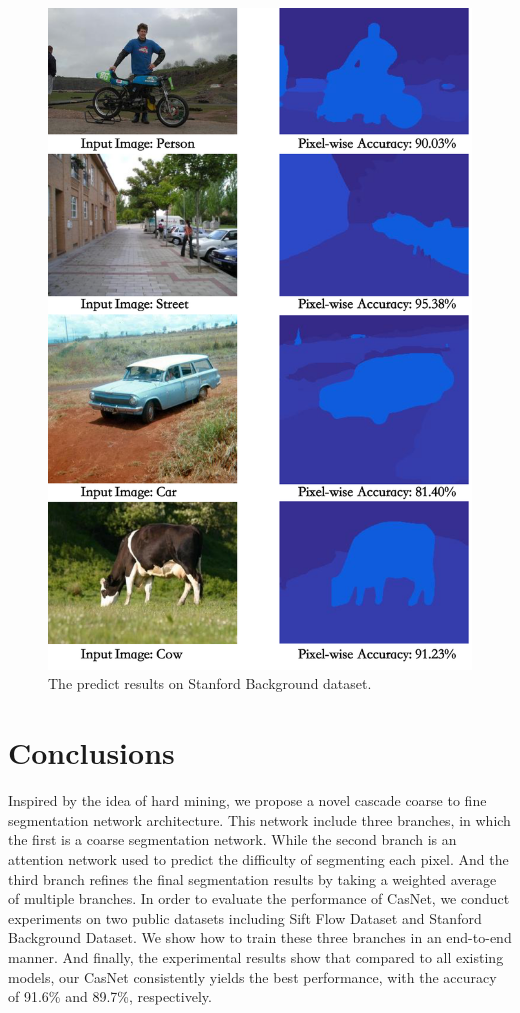 \documentclass[10.5pt,compsoc]{TsT}
\theoremstyle{mystyle}
\begin{document}
{\begin{figure}[ht]
\centering
\includegraphics[width=0.85\columnwidth]{fig4.png}
\caption{The predict results on Stanford Background dataset.}
\label{fig4}
\end{figure} 

\section{Conclusions}
\noindent

Inspired by the idea of hard mining, we propose a novel cascade coarse to fine segmentation network architecture.
This network include three branches, in which the first is a coarse segmentation network.
While the second branch is an attention network used to predict the difficulty of segmenting each pixel.
And the third branch refines the final segmentation results by taking a weighted average of multiple branches.
In order to evaluate the performance of CasNet, we conduct experiments on two public datasets including Sift Flow Dataset and Stanford Background Dataset. 
We show how to train these three branches in an end-to-end manner. And finally, the experimental results show that compared to all existing models, our CasNet consistently yields the best performance, with the accuracy of 91.6\% and 89.7\%, respectively.


}
\end{document}
